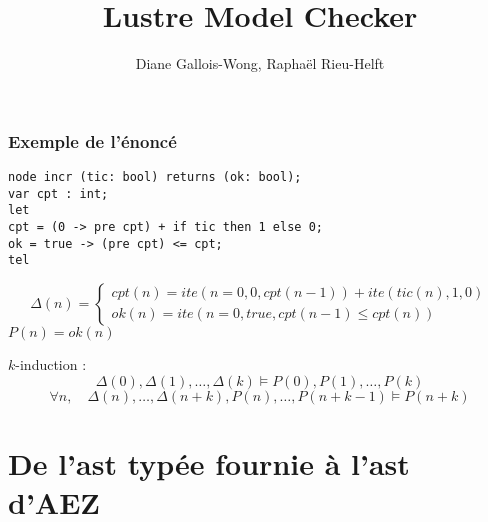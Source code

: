 \documentclass[18pt]{beamer}
\title{Lustre Model Checker}
\author{Diane Gallois-Wong, Raphaël Rieu-Helft}
\begin{document}
\begin{frame}
	\titlepage
\end{frame}
\begin{frame}[fragile]
\frametitle{Exemple de l'énoncé}
\begin{lstlisting}
node incr (tic: bool) returns (ok: bool);
var cpt : int;
let
cpt = (0 -> pre cpt) + if tic then 1 else 0;
ok = true -> (pre cpt) <= cpt;
tel
\end{lstlisting}

$$\Delta(n) =
\begin{cases}
cpt(n) = ite(n=0, 0, cpt(n-1)) + ite(tic(n), 1, 0)
\\
ok(n) = ite(n = 0, true, cpt(n - 1) \leq cpt(n))
\end{cases}
$$
\qquad$P(n) = ok(n)$

\vspace{2em}

	$k$-induction :
	$$\Delta(0), \Delta(1), \ldots, \Delta(k) \models  P(0), P(1), \ldots,  P(k)$$
	$$\forall n,\quad {\Delta(n), \ldots, \Delta(n+k), P(n), \ldots, P(n+k-1) \models P(n+k)}$$

\end{frame}

\begin{frame}
\tableofcontents
\end{frame}

\section{De l'ast typée fournie à l'ast d'AEZ}
\end{document}
